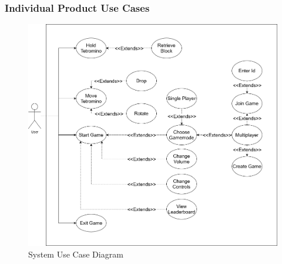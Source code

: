 \documentclass[12pt, titlepage]{article}
\begin{document}
\subsubsection{Individual Product Use Cases}
\begin{figure}[H]
    \centering
    \includegraphics[width=5in]{usecase.png} 
    \caption{System Use Case Diagram}
    \label{wps}
\end{figure}
\end{document}
